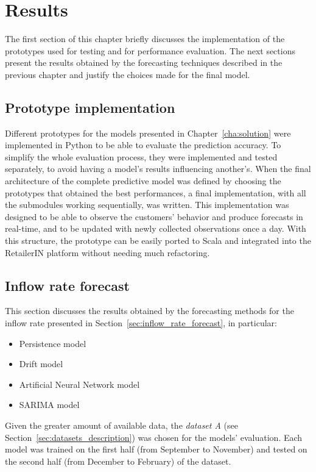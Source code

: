 \chapter{Results}
\label{cha:results}

The first section of this chapter briefly discusses the implementation of the prototypes used for testing and for performance evaluation. The next sections present the results obtained by the forecasting techniques described in the previous chapter and justify the choices made for the final model.

\section{Prototype implementation}
\label{sec:prototype_implementation}

Different prototypes for the models presented in Chapter~\ref{cha:solution} were implemented in Python to be able to evaluate the prediction accuracy. To simplify the whole evaluation process, they were implemented and tested separately, to avoid having a model’s results influencing another’s. When the final architecture of the complete predictive model was defined by choosing the prototypes that obtained the best performances, a final implementation, with all the submodules working sequentially, was written. This implementation was designed to be able to observe the customers' behavior and produce forecasts in real-time, and to be updated with newly collected observations once a day. With this structure, the prototype can be easily ported to Scala and integrated into the RetailerIN platform without needing much refactoring.

\section{Inflow rate forecast}
\label{sec:inflow_rate_forecast_results}

This section discusses the results obtained by the forecasting methods for the inflow rate presented in Section~\ref{sec:inflow_rate_forecast}, in particular:
\begin{itemize}
  \item Persistence model
  \item Drift model
  \item Artificial Neural Network model
  \item SARIMA model
\end{itemize}

Given the greater amount of available data, the \emph{dataset A} (see Section~\ref{sec:datasets_description}) was chosen for the models' evaluation. Each model was trained on the first half (from September to November) and tested on the second half (from December to February) of the dataset.


